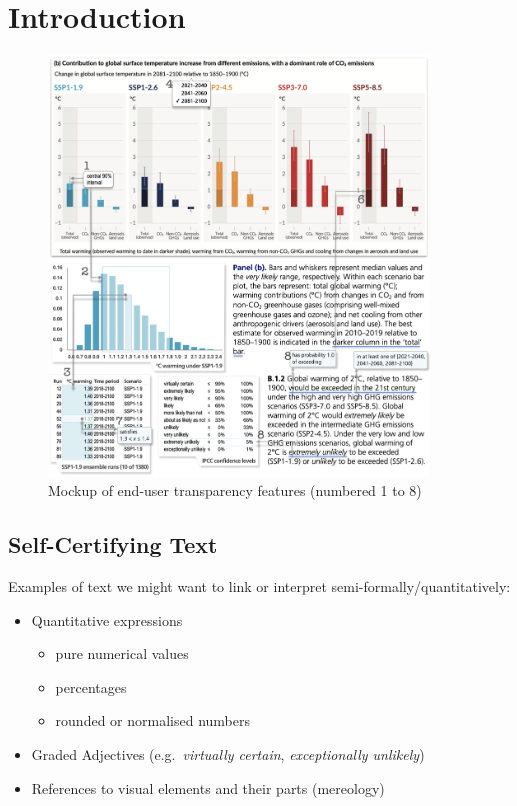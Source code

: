 \section{Introduction}

\begin{figure}[h]
   \includegraphics[width=0.9\textwidth]{fig/ipcc-mockup.png}
   \caption{Mockup of end-user transparency features (numbered 1 to 8)}
   \label{fig:ipcc-mockup}
\end{figure}

\subsection{Self-Certifying Text}
Examples of text we might want to link or interpret semi-formally/quantitatively:

\begin{itemize}
\item Quantitative expressions
\begin{itemize}
   \item pure numerical values
   \item percentages
   \item rounded or normalised numbers
\end{itemize}
\item Graded Adjectives (e.g.~\emph{virtually certain}, \emph{exceptionally unlikely})
\item References to visual elements and their parts (mereology)
\end{itemize}
